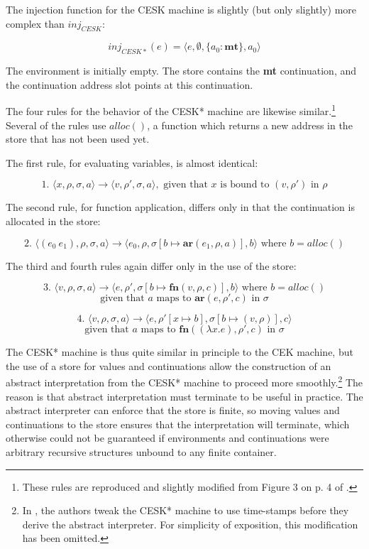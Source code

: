 \documentclass{article}
\begin{document}
The injection function for the CESK machine is slightly (but only slightly) more complex than $inj_{CESK}$:

$$ inj_{CESK*}(e) = \langle e, \emptyset, \{ a_0: \textbf{mt} \}, a_0 \rangle $$

The environment is initially empty. The store contains the \textbf{mt} continuation, and the continuation address slot points at this continuation.

The four rules for the behavior of the CESK* machine are likewise similar.\footnote{These rules are reproduced and slightly modified from Figure 3 on p. 4 of \cite{aam}.} Several of the rules use $alloc()$, a function which returns a new address in the store that has not been used yet.

The first rule, for evaluating variables, is almost identical:

$$
\text{1. }
\langle x, \rho, \sigma, a \rangle
\to
\langle v, \rho', \sigma, a \rangle,
\text{ given that $x$ is bound to $(v, \rho')$ in $\rho$}
$$

The second rule, for function application, differs only in that the continuation is allocated in the store:

$$
\text{2. }
\langle (e_0\ e_1), \rho, \sigma, a \rangle
\to
\langle e_0, \rho, \sigma[b \mapsto \textbf{ar}(e_1, \rho, a)], b \rangle
\text{ where $b = alloc()$}
$$

The third and fourth rules again differ only in the use of the store:

$$
\text{3. }
\langle v, \rho, \sigma, a \rangle
\to
\langle e, \rho', \sigma[b \mapsto \textbf{fn}(v, \rho, c)], b \rangle
\text{ where $b = alloc()$}
$$
$$
\text{given that $a$ maps to $\textbf{ar}(e, \rho', c)$ in $\sigma$}
$$

$$
\text{4. }
\langle v, \rho, \sigma, a \rangle
\to
\langle e, \rho'[x \mapsto b], \sigma[b \mapsto (v, \rho)], c \rangle
$$
$$
\text{given that $a$ maps to $\textbf{fn}((\lambda x.e), \rho', c)$ in $\sigma$}
$$

The CESK* machine is thus quite similar in principle to the CEK machine, but the use of a store for values and continuations allow the construction of an abstract interpretation from the CESK* machine to proceed more smoothly.\footnote{In \cite{aam}, the authors tweak the CESK* machine to use time-stamps before they derive the abstract interpreter. For simplicity of exposition, this modification has been omitted.} The reason is that abstract interpretation must terminate to be useful in practice. The abstract interpreter can enforce that the store is finite, so moving values and continuations to the store ensures that the interpretation will terminate, which otherwise could not be guaranteed if environments and continuations were arbitrary recursive structures unbound to any finite container.
\end{document}
